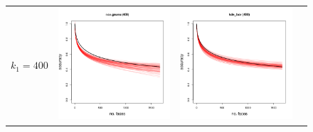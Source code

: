 \documentclass[twoside,11pt]{article}
\newenvironment{myfont}{\fontfamily{phv}\selectfont}{\par}
\begin{document}
\begin{figure}[t]
\begin{tabular}{cccc}
\begin{myfont}$k_1 = 400$\end{myfont} & 
\includegraphics[scale = 0.2, clip = true, trim = 0 0 0 0.6in, valign=c]{repeat_400_r_cv_gauss.png} &
\includegraphics[scale = 0.2, clip = true, trim = 0 0 0 0.6in, valign=c]{repeat_400_kde_bcv.png} &

\end{tabular}
\end{figure}
\end{document}
